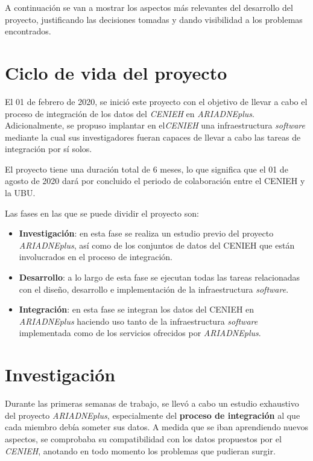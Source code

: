
A continuación se van a mostrar los aspectos más relevantes del
desarrollo del proyecto, justificando las decisiones tomadas y dando
visibilidad a los problemas encontrados.

\section{Ciclo de vida del proyecto}

El 01 de febrero de 2020, se inició este proyecto con el objetivo de
llevar a cabo el proceso de integración de los datos del \emph{CENIEH} en
\emph{ARIADNEplus}. Adicionalmente, se propuso implantar en el\emph{CENIEH} una
infraestructura \emph{software} mediante la cual sus investigadores
fueran capaces de llevar a cabo las tareas de integración por sí
solos. 

El proyecto tiene una duración total de 6 meses, lo que significa
que el 01 de agosto de 2020 dará por concluido el periodo de colaboración entre
el CENIEH y la UBU. 

Las fases en las que se puede dividir el proyecto son:

\begin{itemize}
\tightlist
\item
  \textbf{Investigación}: en esta fase se realiza un estudio previo del
  proyecto \emph{ARIADNEplus}, así como de los conjuntos de datos del CENIEH
  que están involucrados en el proceso de integración.
\item
  \textbf{Desarrollo}: a lo largo de esta fase se ejecutan todas las
  tareas relacionadas con el diseño, desarrollo e implementación de la
  infraestructura \emph{software}.
\item
  \textbf{Integración}: en esta fase se integran los datos del CENIEH en
  \emph{ARIADNEplus} haciendo uso tanto de la infraestructura \emph{software}
  implementada como de los servicios ofrecidos por \emph{ARIADNEplus}.
\end{itemize}


\section{Investigación}

Durante las primeras semanas de trabajo, se llevó a cabo un estudio
exhaustivo del proyecto \emph{ARIADNEplus}, especialmente del \textbf{proceso
de integración} al que cada miembro debía someter sus datos. A medida
que se iban aprendiendo nuevos aspectos, se comprobaba su compatibilidad
con los datos propuestos por el \emph{CENIEH}, anotando en todo momento los
problemas que pudieran surgir.


